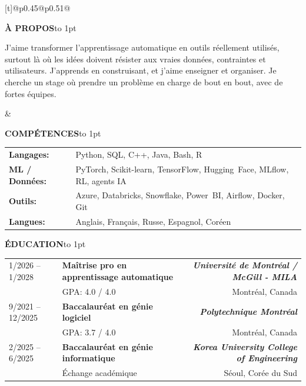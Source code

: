 \documentclass[a4paper,10pt]{article}
\newcommand{\sechead}[1]{\vspace{0.5em}\noindent\textbf{\large #1}\hspace{0.8em}\leaders\hbox to 1pt{\hss\raisebox{0.3em}{\rule{1pt}{0.4pt}}\hss}\hfill\null\par\vspace{0.45em}}
\begin{document}
    \noindent
    \begin{tabularx}{\textwidth}[t]{@{}p{0.45\textwidth}@{\hspace{2em}}p{0.51\textwidth}@{}}
      \parbox[t]{\linewidth}{
        \sechead{À PROPOS}
            J’aime transformer l’apprentissage automatique en outils réellement utilisés, surtout là où les idées doivent résister aux vraies données, contraintes et utilisateurs. J’apprends en construisant, et j’aime enseigner et organiser. Je cherche un stage où prendre un problème en charge de bout en bout, avec de fortes équipes.
      }
      &
      \parbox[t]{\linewidth}{
        \sechead{COMPÉTENCES}
        \begin{tabular}{@{}p{2.3cm}>{\raggedright\arraybackslash}p{\dimexpr\linewidth-3.2cm}@{}}
          \textbf{Langages:} & Python, SQL, C++, Java, Bash, R \\[0.2em]
          \textbf{ML / Données:} & PyTorch, Scikit-learn, TensorFlow, \mbox{Hugging Face}, MLflow, RL, agents IA \\[0.2em]
          \textbf{Outils:} & Azure, Databricks, Snowflake, \mbox{Power BI}, \mbox{Airflow}, Docker, Git \\[0.2em]
          \textbf{Langues:} & Anglais, Français, Russe, Espagnol, \mbox{Coréen}
        \end{tabular}
      }
    \end{tabularx}
    
    \vspace{0.2em}
    \sechead{ÉDUCATION}
    
    \begin{tabularx}{\textwidth}{@{}p{3cm} X r@{}}
        1/2026 -- 1/2028 & 
        \textbf{Maîtrise pro en apprentissage automatique} 
        & \textbf{\textit{Université de Montréal / McGill  - MILA}} \\ 
        & GPA: 4.0 / 4.0 & 
        Montréal, Canada \\[0.2em]
        
        9/2021 -- 12/2025 & 
        \textbf{Baccalauréat en génie logiciel} 
        & \textbf{\textit{Polytechnique Montréal}} \\ 
        & GPA: 3.7 / 4.0 & 
        Montréal, Canada \\[0.2em]
        
        2/2025 -- 6/2025 & 
        \textbf{Baccalauréat en génie informatique} 
        & \textbf{\textit{Korea University College of Engineering}} \\ 
        & Échange académique & 
        Séoul, Corée du Sud
    \end{tabularx}
    
\end{document}
